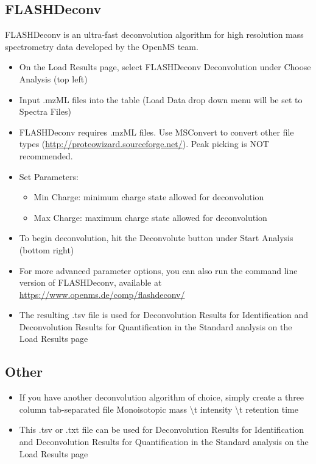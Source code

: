 \subsection{FLASHDeconv}
FLASHDeconv is an ultra-fast deconvolution algorithm for high resolution mass spectrometry data developed by the OpenMS team.\supercite{Jeong2020}
\begin{itemize}
\item On the Load Results page, select FLASHDeconv Deconvolution under Choose Analysis (top left)
\item Input .mzML files into the table (Load Data drop down menu will be set to Spectra Files)
\item FLASHDeconv requires .mzML files. Use MSConvert to convert other file types (\url{http://proteowizard.sourceforge.net/}). Peak picking is NOT recommended.
\item Set Parameters:
\begin{itemize}
\item Min Charge: minimum charge state allowed for deconvolution
\item Max Charge: maximum charge state allowed for deconvolution
\end{itemize}
\item To begin deconvolution, hit the Deconvolute button under Start Analysis (bottom right)
\item For more advanced parameter options, you can also run the command line version of FLASHDeconv, available at \url{https://www.openms.de/comp/flashdeconv/}
\item The resulting .tsv file is used for Deconvolution Results for Identification and Deconvolution Results for Quantification in the Standard analysis on the Load Results page
\end{itemize}

\subsection{Other}
\begin{itemize}
\item If you have another deconvolution algorithm of choice, simply create a three column tab-separated file
\subitem Monoisotopic mass \textbackslash t intensity \textbackslash t retention time
\item This .tsv or .txt file can be used for Deconvolution Results for Identification and Deconvolution Results for Quantification in the Standard analysis on the Load Results page
\end{itemize}